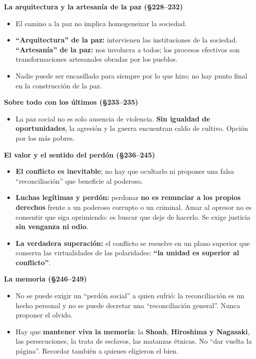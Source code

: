 \documentclass[10pt,a4paper]{article}
\begin{document}
\medskip\noindent \textbf{La arquitectura y la artesanía de la paz (\S{}228--232)}\par\nopagebreak
\begin{itemize}
\item El camino a la paz no implica homogeneizar la sociedad.
\item \textbf{``Arquitectura'' de la paz:} intervienen las instituciones de la sociedad. \textbf{``Artesanía'' de la paz:} nos involucra a todos; los procesos efectivos son transformaciones artesanales obradas por los pueblos.
\item Nadie puede ser encasillado para siempre por lo que hizo; no hay punto final en la construcción de la paz.
\end{itemize}

\medskip\noindent \textbf{Sobre todo con los últimos (\S{}233--235)}\par\nopagebreak
\begin{itemize}
\item La paz social no es solo ausencia de violencia. \textbf{Sin igualdad de oportunidades}, la agresión y la guerra encuentran caldo de cultivo. Opción por los más pobres.
\end{itemize}

\medskip\noindent \textbf{El valor y el sentido del perdón (\S{}236--245)}\par\nopagebreak
\begin{itemize}
\item \textbf{El conflicto es inevitable}; no hay que ocultarlo ni proponer una falsa ``reconciliación'' que beneficie al poderoso.
\item \textbf{Luchas legítimas y perdón:} perdonar \textbf{no es renunciar a los propios derechos} frente a un poderoso corrupto o un criminal. Amar al opresor no es consentir que siga oprimiendo: es buscar que deje de hacerlo. Se exige justicia \textbf{sin venganza ni odio}.
\item \textbf{La verdadera superación:} el conflicto se resuelve en un plano superior que conserva las virtualidades de las polaridades: \textbf{``la unidad es superior al conflicto''}.
\end{itemize}

\medskip\noindent \textbf{La memoria (\S{}246--249)}\par\nopagebreak
\begin{itemize}
\item No se puede exigir un ``perdón social'' a quien sufrió: la reconciliación es un hecho personal y no se puede decretar una ``reconciliación general''. Nunca proponer el olvido.
\item Hay que \textbf{mantener viva la memoria}: la \textbf{Shoah}, \textbf{Hiroshima y Nagasaki}, las persecuciones, la trata de esclavos, las matanzas étnicas. No ``dar vuelta la página''. Recordar también a quienes eligieron el bien.
\end{itemize}
\end{document}
